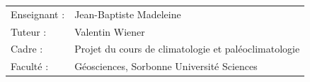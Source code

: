 \begin{titlepage}
\begin{center}
\begin{center}
\end{center}


\bigskip

\bigskip

\begin{tabular}{ll}
    Enseignant : & Jean-Baptiste Madeleine \\
    Tuteur : &  Valentin Wiener\\
    Cadre : & Projet du cours de climatologie et paléoclimatologie \\
    Faculté : & Géosciences, Sorbonne Université Sciences
\end{tabular}

\bigskip
\bigskip

\begin{tabular}{p{15mm}p{10cm}}
\end{tabular}

\end{center}


\end{titlepage}
